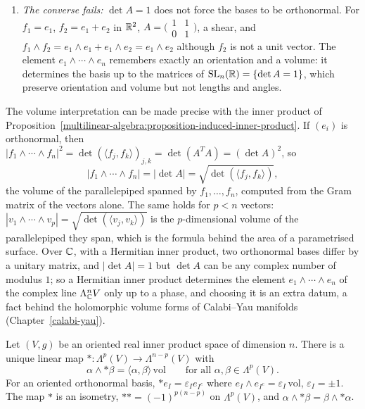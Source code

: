 \begin{remark}
\begin{enumerate}
\item \emph{The converse fails:} $\det A = 1$ does not force the bases to be orthonormal. For $f_1 = e_1$, $f_2 = e_1 + e_2$ in $\mathbb{R}^2$, $A = \bigl(\begin{smallmatrix} 1 & 1\\ 0 & 1\end{smallmatrix}\bigr)$, a shear, and
$f_1 \wedge f_2 = e_1 \wedge e_1 + e_1 \wedge e_2 = e_1 \wedge e_2$ although $f_2$ is not a unit vector. The element $e_1 \wedge \cdots \wedge e_n$ remembers exactly an orientation and a volume: it determines the
basis up to the matrices of $\mathrm{SL}_n(\mathbb{R}) = \{\det A = 1\}$, which preserve orientation and volume but not lengths and angles.
\end{enumerate}
The volume interpretation can be made precise with the inner product of Proposition~\ref{multilinear-algebra:proposition-induced-inner-product}. If $(e_i)$ is orthonormal, then
$|f_1 \wedge \cdots \wedge f_n|^2 = \det(\langle f_j, f_k\rangle)_{j,k} = \det(A^TA) = (\det A)^2$, so
\[
|f_1 \wedge \cdots \wedge f_n| = |\det A| = \sqrt{\det(\langle f_j, f_k\rangle)} ,
\]
the volume of the parallelepiped spanned by $f_1, \ldots, f_n$, computed from the Gram matrix of the vectors alone. The same holds for $p < n$ vectors: $|v_1 \wedge \cdots \wedge v_p| = \sqrt{\det(\langle v_j, v_k\rangle)}$ is the
$p$-dimensional volume of the parallelepiped they span, which is the formula behind the area of a parametrised surface. Over $\mathbb{C}$, with a Hermitian inner product, two orthonormal bases differ by a unitary
matrix, and $|\det A| = 1$ but $\det A$ can be any complex number of modulus $1$; so a Hermitian inner product determines the element $e_1 \wedge \cdots \wedge e_n$ of the complex line $\Lambda^n_{\mathbb{C}} V$ only up to a phase, and
choosing it is an extra datum, a fact behind
the holomorphic volume forms of Calabi--Yau manifolds (Chapter~\ref{calabi-yau}).
\end{remark}

\begin{theorem}\label{multilinear-algebra:theorem-hodge-star}
Let $(V, g)$ be an oriented real inner product space of dimension $n$. There is a unique linear map
$* \colon \Lambda^p(V) \to \Lambda^{n-p}(V)$ with
\[
\alpha \wedge *\beta = \langle \alpha, \beta \rangle\, \mathrm{vol} \qquad \text{for all } \alpha, \beta \in \Lambda^p(V).
\]
For an oriented orthonormal basis, $*e_I = \varepsilon_I e_{I^c}$ where $e_I \wedge e_{I^c} = \varepsilon_I\,\mathrm{vol}$,
$\varepsilon_I = \pm 1$. The map $*$ is an isometry, $** = (-1)^{p(n-p)}$ on $\Lambda^p(V)$, and
$\alpha \wedge *\beta = \beta \wedge *\alpha$.
\end{theorem}

